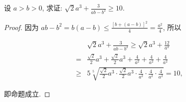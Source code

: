 \begin{example}
	设 $a>b>0$, 求证: $\sqrt{2} a^{3}+\frac{3}{a b-b^{2}} \geqslant 10$.
\end{example}
\begin{proof}
	因为 $a b-b^{2}=b(a-b) \leqslant \frac{[b+(a-b)]^{2}}{4}=\frac{a^{2}}{4}$, 所以
	
	$$
	\begin{aligned}
	& \sqrt{2} a^{3}+\frac{3}{a b-b^{2}} \geqslant \sqrt{2} a^{3}+\frac{12}{a^{2}} \\
	= & \frac{\sqrt{2}}{2} a^{3}+\frac{\sqrt{2}}{2} a^{3}+\frac{4}{a^{2}}+\frac{4}{a^{2}}+\frac{4}{a^{2}} \\
	\geqslant & 5 \sqrt[5]{\frac{\sqrt{2}}{2} a^{3} \cdot \frac{\sqrt{2}}{2} a^{3} \cdot \frac{4}{a^{2}} \cdot \frac{4}{a^{2}} \cdot \frac{4}{a^{2}}}=10,
	\end{aligned}
	$$
	
	即命题成立.
\end{proof}
